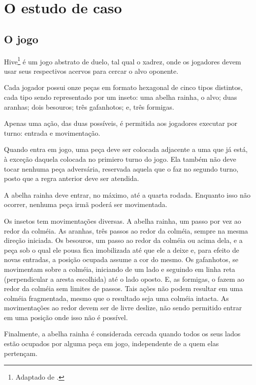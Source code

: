 \documentclass[12pt,a4paper,oneside,english,brazil]{article}
\begin{document}
  \section{O estudo de caso}

    \subsection{O jogo}

    Hive\footnote{Adaptado de \cite{UltraBoardGames2020}.} é um jogo
    abstrato de duelo, tal qual o xadrez, onde os jogadores devem usar seus
    respectivos acervos para cercar o alvo oponente.

    Cada jogador possui onze peças em formato hexagonal de cinco tipos
    distintos, cada tipo sendo representado por um inseto: uma abelha rainha, o
    alvo; duas aranhas; dois besouros; três gafanhotos; e, três formigas.

    Apenas uma ação, das duas possíveis, é permitida aos jogadores executar por
    turno: entrada e movimentação.

    Quando entra em jogo, uma peça deve ser colocada adjacente a uma que já
    está, à exceção daquela colocada no primiero turno do jogo. Ela também não
    deve tocar nenhuma peça adversária, reservada aquela que o faz no segundo
    turno, posto que a regra anterior deve ser atendida.

    A abelha rainha deve entrar, no máximo, até a quarta rodada. Enquanto isso
    não ocorrer, nenhuma peça irmã poderá ser movimentada.

    Os insetos tem movimentações diversas. A abelha rainha, um passo por vez ao
    redor da colméia. As aranhas, três passos ao redor da colméia, sempre na
    mesma direção iniciada. Os besouros, um passo ao redor da colméia ou acima
    dela, e a peça sob o qual ele pousa fica imobilizada até que ele a deixe e,
    para efeito de novas entradas, a posição ocupada assume a cor do mesmo. Os
    gafanhotos, se movimentam sobre a colméia, iniciando de um lado e seguindo
    em linha reta (perpendicular a aresta escolhida) até o lado oposto.
    E,  as formigas, o fazem ao redor da colméia sem limites de passos. Tais
    ações não podem resultar em uma colméia fragmentada, mesmo que o resultado
    seja uma colméia intacta. As movimentações ao redor devem ser de livre
    deslize, não sendo permitido entrar em uma posição onde isso não é possível.

    Finalmente, a abelha rainha é considerada cercada quando todos os seus lados
    estão ocupados por alguma peça em jogo, independente de a quem elas
    pertençam.
\end{document}
